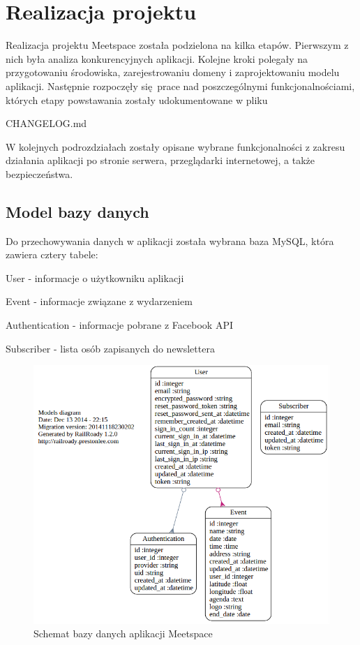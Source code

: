 \section{Realizacja projektu}
Realizacja projektu Meetspace została podzielona na kilka etapów. Pierwszym z nich była analiza konkurencyjnych aplikacji. Kolejne kroki polegały na przygotowaniu środowiska, zarejestrowaniu domeny i zaprojektowaniu modelu aplikacji. Następnie rozpoczęły się prace nad poszczególnymi funkcjonalnościami, których etapy powstawania zostały udokumentowane w pliku \begin{tt}CHANGELOG.md\end{tt}

W kolejnych podrozdziałach zostały opisane wybrane funkcjonalności z zakresu działania aplikacji po stronie serwera, przeglądarki internetowej, a także bezpieczeństwa.
  \clearpage
  \subsection{Model bazy danych}
    Do przechowywania danych w aplikacji została wybrana baza MySQL, która zawiera cztery tabele:
    \begin{itemizeReduced}
      \item User - informacje o użytkowniku aplikacji
      \item Event - informacje związane z wydarzeniem
      \item Authentication - informacje pobrane z Facebook API
      \item Subscriber - lista osób zapisanych do newslettera
    \end{itemizeReduced}

    \begin{figure}[h]
      \centering
        \includegraphics[scale=0.55]{images/dbm.png}
      \caption{Schemat bazy danych aplikacji Meetspace}
    \end{figure}

